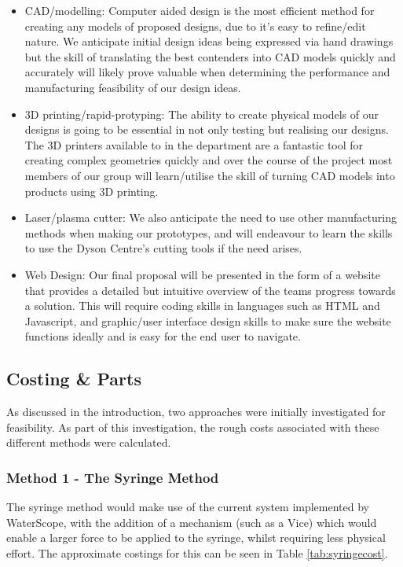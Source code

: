 \documentclass[12pt]{article}
\begin{document}
\begin{itemize}
\item CAD/modelling: Computer aided design is the most efficient method for creating any models of proposed designs, due to it's easy to refine/edit nature. We anticipate initial design ideas being expressed via hand drawings but the skill of translating the best contenders into CAD models quickly and accurately will likely prove valuable when determining the performance and manufacturing feasibility of our design ideas. 
\item 3D printing/rapid-protyping: The ability to create physical models of our designs is going to be essential in not only testing but realising our designs. The 3D printers available to in the department are a fantastic tool for creating complex geometries quickly and over the course of the project most members of our group will learn/utilise the skill of turning CAD models into products using 3D printing. 
\item Laser/plasma cutter: We also anticipate the need to use other manufacturing methods when making our prototypes, and will endeavour to learn the skills to use the Dyson Centre's cutting tools if the need arises. 
\item Web Design: Our final proposal will be presented in the form of a website that provides a detailed but intuitive overview of the teams progress towards a solution. This will require coding skills in languages such as HTML and Javascript, and graphic/user interface design skills to make sure the website functions ideally and is easy for the end user to navigate.  
\end{itemize}

\subsection{Costing \& Parts}

As discussed in the introduction, two approaches were initially investigated for feasibility. As part of this investigation, the rough costs associated with these different methods were calculated. 

\subsubsection{Method 1 - The Syringe Method}
The syringe method would make use of the current system implemented by WaterScope, with the addition of a mechanism (such as a Vice) which would enable a larger force to be applied to the syringe, whilst requiring less physical effort. The approximate costings for this can be seen in Table \ref{tab:syringecost}.
\end{document}
